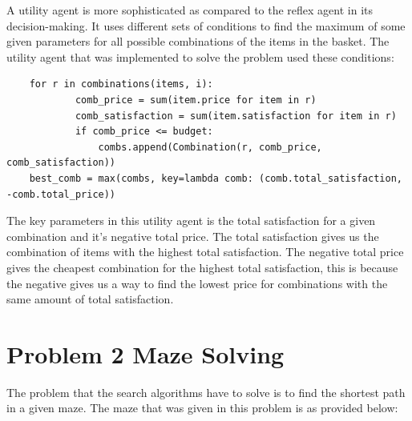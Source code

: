 \documentclass[runningheads]{llncs}
\begin{document}
A utility agent is more sophisticated as compared to the reflex agent in its decision-making. It uses different sets of conditions to find the maximum of some given parameters for all possible combinations of the items in the basket. The utility agent that was implemented to solve the problem used these conditions:
\begin{verbatim}
    for r in combinations(items, i):
            comb_price = sum(item.price for item in r)
            comb_satisfaction = sum(item.satisfaction for item in r)
            if comb_price <= budget:
                combs.append(Combination(r, comb_price, comb_satisfaction))
    best_comb = max(combs, key=lambda comb: (comb.total_satisfaction, -comb.total_price))
\end{verbatim}

The key parameters in this utility agent is the total satisfaction for a given combination and it's negative total price. The total satisfaction gives us the combination of items with the highest total satisfaction. The negative total price gives the cheapest combination for the highest total satisfaction, this is because the negative gives us a way to find the lowest price for combinations with the same amount of total satisfaction.

\section{Problem 2 Maze Solving}

The problem that the search algorithms have to solve is to find the shortest path in a given maze. The maze that was given in this problem is as provided below:
\end{document}
